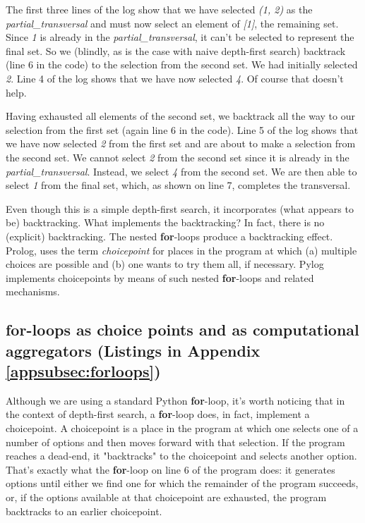 The first three lines of the log show that we have selected \textit{(1, 2)} as the \textit{partial\_transversal} and must now select an element of \textit{[1]}, the remaining set. Since \textit{1} is already in the \textit{partial\_transversal}, it can't be selected to represent the final set. So we (blindly, as is the case with naive depth-first search) backtrack (line 6 in the code) to the selection from the second set. We had initially selected \textit{2}. Line 4 of the log shows that we have now selected \textit{4}. Of course that doesn't help. 

Having exhausted all elements of the second set, we backtrack all the way to our selection from the first set (again line 6 in the code). Line 5 of the log shows that we have now selected \textit{2} from the first set and are about to make a selection from the second set. We cannot select \textit{2} from the second set since it is already in the \textit{partial\_transversal}. Instead, we select \textit{4} from the second set. We are then able to select \textit{1} from the final set, which, as shown on line 7, completes the transversal.

Even though this is a simple depth-first search, it incorporates (what appears to be) backtracking. What implements the backtracking? In fact, there is no (explicit) backtracking. The nested \textbf{for}-loops produce a backtracking effect.  Prolog, uses the term \textit{choicepoint} for places in the program at which (a) multiple choices are possible and (b) one wants to try them all, if necessary. Pylog implements choicepoints by means of such nested \textbf{for}-loops and related mechanisms. 

\subsection{\textbf{for}-loops as choice points and as computational aggregators (Listings in Appendix \ref{appsubsec:forloops})} \label{subsec:forloops}

Although we are using a standard Python \textbf{for}-loop, it's worth noticing that in the context of depth-first search, a \textbf{for}-loop does, in fact, implement a choicepoint. A choicepoint is a place in the program at which one selects one of a number of options and then moves forward with that selection. If the program reaches a dead-end, it "backtracks" to the choicepoint and selects another option. That's exactly what the \textbf{for}-loop on line 6 of the program does: it generates options until either we find one for which the remainder of the program succeeds, or, if the options available at that choicepoint are exhausted, the program backtracks to an earlier choicepoint.

